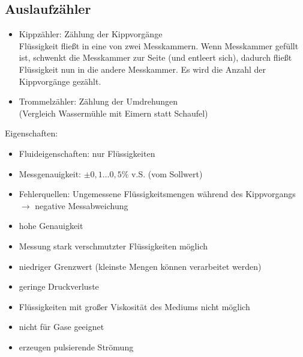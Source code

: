 \subsection{Auslaufzähler}
\begin{itemize}
\item Kippzähler: Zählung der Kippvorgänge\\
Flüssigkeit fließt in eine von zwei Messkammern. Wenn Messkammer gefüllt ist, schwenkt die Messkammer zur Seite (und entleert sich), dadurch fließt Flüssigkeit nun in die andere Messkammer. Es wird die Anzahl der Kippvorgänge gezählt.
\item Trommelzähler: Zählung der Umdrehungen\\
(Vergleich Wassermühle mit Eimern statt Schaufel)
\end{itemize}
Eigenschaften:
\begin{itemize}
\item Fluideigenschaften: nur Flüssigkeiten
\item Messgenauigkeit: $\pm 0,1 \ldots 0,5 \%$ v.S. (vom Sollwert)
\item Fehlerquellen: Ungemessene Flüssigkeitsmengen während des Kippvorgangs\\
$\to$ negative Messabweichung
\end{itemize}
\begin{itemize}[label=$+$]
\item hohe Genauigkeit
\item Messung stark verschmutzter Flüssigkeiten möglich
\item niedriger Grenzwert (kleinste Mengen können verarbeitet werden)
\item geringe Druckverluste
\end{itemize}
\begin{itemize}[label=$-$]
\item Flüssigkeiten mit großer Viskosität des Mediums nicht möglich
\item nicht für Gase geeignet
\item erzeugen pulsierende Strömung
\end{itemize}

